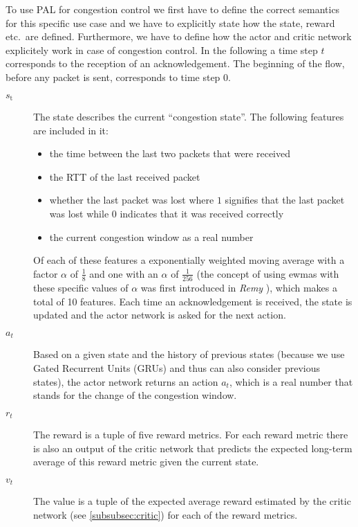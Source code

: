 \documentclass[sigconf]{acmart}
\begin{document}
To use PAL for congestion control we first have to define the correct semantics for this specific use case and we have to explicitly state how the state, reward etc.~are defined. Furthermore, we have to define how the actor and critic network explicitely work in case of congestion control. In the following a time step $t$ corresponds to the reception of an acknowledgement. The beginning of the flow, before any packet is sent, corresponds to time step $0$.

\begin{description}
\item[$\textit{s}_\text{t}$] The state  describes the current ``congestion state''. The following features are included in it:
\begin{itemize}
\item the time between the last two packets that were received
\item the RTT of the last received packet
\item whether the last packet was lost where $1$ signifies that the last packet was lost while $0$ indicates that it was received correctly
\item the current congestion window as a real number
\end{itemize}
Of each of these features a exponentially weighted moving average with a factor $\alpha$ of $\frac{1}{8}$ and one with an $\alpha$ of $\frac{1}{256}$ (the concept of using ewmas with these specific values of $\alpha$ was first introduced in \textit{Remy} \cite{winstein_tcp_2013}), which makes a total of 10 features.  
Each time an acknowledgement is received, the state is updated and the actor network is asked for the next action.
\item[$\textit{a}_t$] Based on a given state and the history of previous states (because we use Gated Recurrent Units (GRUs) and thus can also consider previous states), the actor network returns an action $a_t$, which is a real number that stands for the change of the congestion window. 
\item[$\textit{r}_t$] The reward is a tuple of five reward metrics. 
For each reward metric there is also an output of the critic network that predicts the expected long-term average of this reward metric given the current state. 
\item[$\textit{v}_t$] The value is a tuple of the expected average reward estimated by the critic network (see \autoref{subsubsec:critic}) for each of the reward metrics. 
\end{description}
\end{document}
